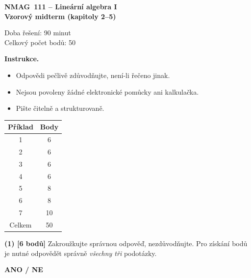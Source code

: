 \documentclass[12pt,a4paper]{article}
\begin{document}
\begin{center}
\Large
\textbf{NMAG~111 -- Lineární algebra I}\\
\vspace{2mm}
\textbf{Vzorový midterm (kapitoly 2--5)}
\normalsize

\vspace{2mm}
Doba řešení: 90 minut \\
Celkový počet bodů: 50
\end{center}

\vspace{4mm}

\textbf{Instrukce.}
\begin{itemize}
  \item Odpovědi pečlivě zdůvodňujte, není-li řečeno jinak.
  \item Nejsou povoleny žádné elektronické pomůcky ani kalkulačka.
  \item Pište čitelně a strukturovaně.
\end{itemize}

\vspace{4mm}

\begin{center}
\begin{tabular}{|c|c|}
\hline
Příklad & Body \\
\hline
1 & 6 \\
2 & 6 \\
3 & 6 \\
4 & 6 \\
5 & 8 \\
6 & 8 \\
7 & 10 \\
\hline
Celkem & 50 \\
\hline
\end{tabular}
\end{center}

\newpage

\textbf{(1) [6 bodů]} Zakroužkujte správnou odpověď, nezdůvodňujte.
Pro získání bodů je nutné odpovědět správně \emph{všechny tři} podotázky.

\medskip
\textbf{ANO / NE}
\end{document}
